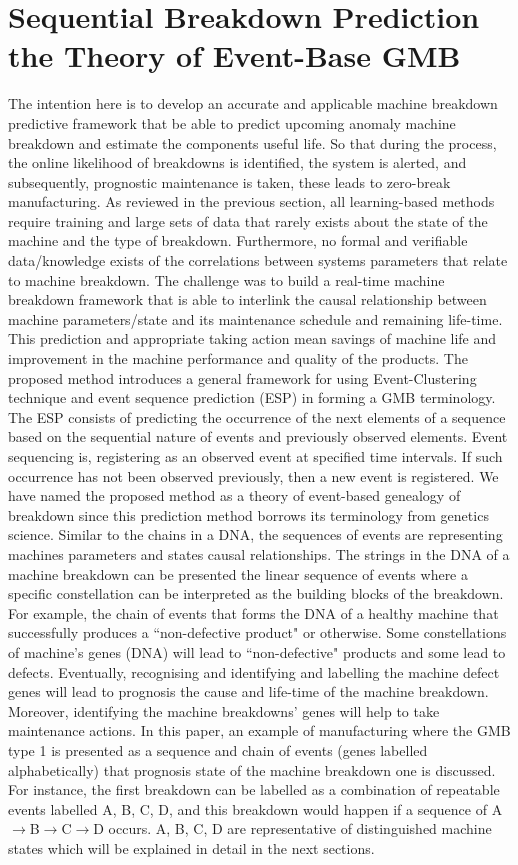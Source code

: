 \documentclass[conference]{IEEEtran}
\begin{document}
\section{Sequential Breakdown Prediction the Theory of Event-Base GMB}
\label{sec:GMB}
The intention here is to develop an accurate and applicable machine breakdown predictive framework that be able to predict upcoming anomaly machine breakdown and estimate the components useful life. So that during the process, the online likelihood of breakdowns is identified, the system is alerted, and subsequently, prognostic maintenance is taken, these leads to zero-break manufacturing. As reviewed in the previous section, all learning-based methods require training and large sets of data that rarely exists about the state of the machine and the type of breakdown. Furthermore, no formal and verifiable data/knowledge exists of the correlations between systems parameters that relate to machine breakdown. The challenge was to build a real-time machine breakdown framework that is able to interlink the causal relationship between machine parameters/state and its maintenance schedule and remaining life-time. This prediction and appropriate taking action mean savings of machine life and improvement in the machine performance and quality of the products. The proposed method introduces a general framework for using Event-Clustering technique \cite{Danishvar2018} and event sequence prediction (ESP) in forming a GMB terminology. The ESP consists of predicting the occurrence of the next elements of a sequence based on the sequential nature of events and previously observed elements. Event sequencing is, registering as an observed event at specified time intervals. If such occurrence has not been observed previously, then a new event is registered. We have named the proposed method as a theory of event-based genealogy of breakdown since this prediction method borrows its terminology from genetics science. Similar to the chains in a DNA, the sequences of events are representing machines parameters and states causal relationships. The strings in the DNA of a machine breakdown can be presented the linear sequence of events where a specific constellation can be interpreted as the building blocks of the breakdown. For example, the chain of events that forms the DNA of a healthy machine that successfully produces a ``non-defective product" or otherwise. Some constellations of machine's genes (DNA) will lead to ``non-defective" products and some lead to defects. Eventually, recognising and identifying and labelling the machine defect genes will lead to prognosis the cause and life-time of the machine breakdown. Moreover, identifying the machine breakdowns' genes will help to take maintenance actions. In this paper, an example of manufacturing where the GMB type 1 is presented as a sequence and chain of events (genes labelled alphabetically) that prognosis state of the machine breakdown one is discussed. For instance, the first breakdown can be labelled as a combination of repeatable events labelled A, B, C, D, and this breakdown would happen if a sequence of A$\to$B$\to$C$\to$D occurs. A, B, C, D are representative of distinguished machine states which will be explained in detail in the next sections.
\end{document}
